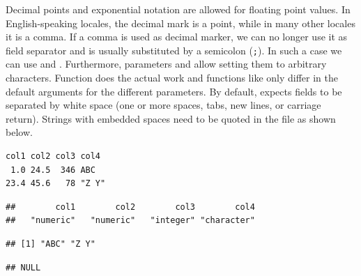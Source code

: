 \documentclass[krantz2]{krantz}\usepackage{knitr}
\begin{document}
Decimal points and exponential notation are allowed for floating point values. In English-speaking locales, the decimal mark is a point, while in many other locales it is a comma. If a comma is used as decimal marker, we can no longer use it as field separator and is usually substituted by a semicolon (\verb|;|). In such a case we can use  and . Furthermore, parameters  and  allow setting them to arbitrary characters. Function  does the actual work and functions like  only differ in the default arguments for the different parameters. By default,  expects fields to be separated by white space (one or more spaces, tabs, new lines, or carriage return). Strings with embedded spaces need to be quoted in the file as shown below.

\begin{knitrout}\footnotesize
{}\color{fgcolor}\begin{kframe}
\begin{verbatim}
col1 col2 col3 col4
 1.0 24.5  346 ABC
23.4 45.6   78 "Z Y"
\end{verbatim}
\end{kframe}
\end{knitrout}

\begin{knitrout}\footnotesize
{}\color{fgcolor}\begin{kframe}
\begin{alltt}
 \hlkwb{<-} \hlstd{(}\hlstd{,}  \hlstd{=} \hlstd{)}
\end{alltt}
\end{kframe}
\end{knitrout}

\begin{knitrout}\footnotesize
{}\color{fgcolor}\begin{kframe}
\begin{alltt}
\end{alltt}
\begin{verbatim}
##        col1        col2        col3        col4 
##   "numeric"   "numeric"   "integer" "character"
\end{verbatim}
\begin{alltt}
\hlstd{from_txt_b.df[[}\hlstd{]]}
\end{alltt}
\begin{verbatim}
## [1] "ABC" "Z Y"
\end{verbatim}
\begin{alltt}
\hlstd{(from_txt_b.df[[}\hlstd{]])}
\end{alltt}
\begin{verbatim}
## NULL
\end{verbatim}
\end{kframe}
\end{knitrout}
\end{document}
